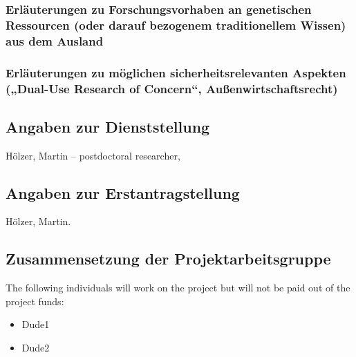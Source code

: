 \documentclass{scrartcl}
\begin{document}
\subsubsection{Erläuterungen zu Forschungsvorhaben an genetischen Ressourcen (oder 
darauf bezogenem traditionellem Wissen) aus dem Ausland}

\subsubsection{Erläuterungen zu möglichen sicherheitsrelevanten Aspekten („Dual-Use 
Research of Concern``, Außenwirtschaftsrecht)}


\subsection{Angaben zur Dienststellung}
H\"olzer, Martin -- postdoctoral researcher, 

\subsection{Angaben zur Erstantragstellung}
H\"olzer, Martin.

\subsection{Zusammensetzung der Projektarbeitsgruppe}
The following individuals will work on the project but will not be paid out of
the project funds:

\begin{itemize}
\item Dude1
\item Dude2
\end{itemize}
\end{document}
